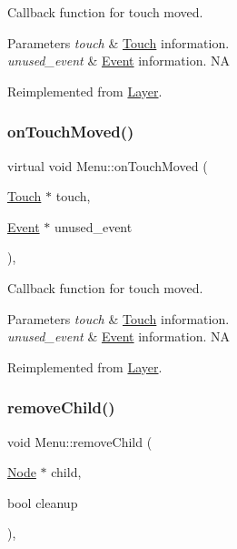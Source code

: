 Callback function for touch moved.


\begin{DoxyParams}{Parameters}
{\em touch} & \hyperlink{classTouch}{Touch} information. \\
\hline
{\em unused\+\_\+event} & \hyperlink{classEvent}{Event} information.  NA \\
\hline
\end{DoxyParams}


Reimplemented from \hyperlink{classLayer_ad614a7a347f171cd6185e7aeef125047}{Layer}.

\mbox{\label{classMenu_a0d8965a2a3df64d987e2bc91f77a43fd}} 
\subsubsection{\texorpdfstring{on\+Touch\+Moved()}{onTouchMoved()}\hspace{0.1cm}{\footnotesize\ttfamily [2/2]}}
{\footnotesize\ttfamily virtual void Menu\+::on\+Touch\+Moved (\begin{DoxyParamCaption}\item[{\hyperlink{classTouch}{Touch} $\ast$}]{touch,  }\item[{\hyperlink{classEvent}{Event} $\ast$}]{unused\+\_\+event }\end{DoxyParamCaption})\hspace{0.3cm}{\ttfamily [override]}, {\ttfamily [virtual]}}

Callback function for touch moved.


\begin{DoxyParams}{Parameters}
{\em touch} & \hyperlink{classTouch}{Touch} information. \\
\hline
{\em unused\+\_\+event} & \hyperlink{classEvent}{Event} information.  NA \\
\hline
\end{DoxyParams}


Reimplemented from \hyperlink{classLayer_ad614a7a347f171cd6185e7aeef125047}{Layer}.

\mbox{\label{classMenu_a671c3f506ddcf0532144056289721540}} 
\subsubsection{\texorpdfstring{remove\+Child()}{removeChild()}\hspace{0.1cm}{\footnotesize\ttfamily [1/2]}}
{\footnotesize\ttfamily void Menu\+::remove\+Child (\begin{DoxyParamCaption}\item[{\hyperlink{classNode}{Node} $\ast$}]{child,  }\item[{bool}]{cleanup }\end{DoxyParamCaption})\hspace{0.3cm}{\ttfamily [override]}, {\ttfamily [virtual]}}

